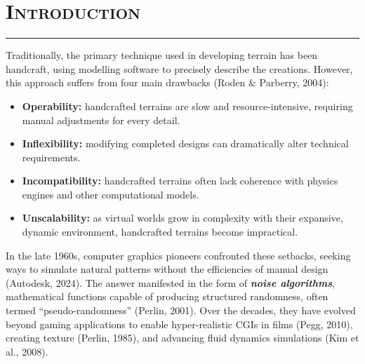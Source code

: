 \section{\textsc{Introduction}}
\hrule height 0.5pt
\vspace*{2.5pt}
Traditionally, the primary technique used in developing terrain has been handcraft,
using modelling software to precisely describe the creations. However, this approach
suffers from four main drawbacks (Roden \& Parberry, 2004):
\begin{itemize}
    \item \textbf{Operability:} handcrafted terrains are slow and resource-intensive, requiring
    manual adjustments for every detail.
    \item \textbf{Inflexibility:} modifying completed designs can dramatically alter technical
    requirements.
    \item \textbf{Incompatibility:} handcrafted terrains often lack coherence with physics engines
    and other computational models.
    \item \textbf{Unscalability:} as virtual worlds grow in complexity with their expansive, dynamic
    environment, handcrafted terrains become impractical.
\end{itemize}
In the late 1960s, computer graphics pioneers confronted these setbacks, seeking ways to simulate natural
patterns without the efficiencies of manual design (Autodesk, 2024). The answer manifested in the form of
\emph{\textbf{noise algorithms}}, mathematical functions capable of producing structured randomness, often termed ``pseudo-randomness''
(Perlin, 2001). Over the decades, they have evolved beyond gaming applications to enable hyper-realistic CGIs in films
(Pegg, 2010), creating texture (Perlin, 1985), and advancing fluid dynamics simulations (Kim et al., 2008). 

